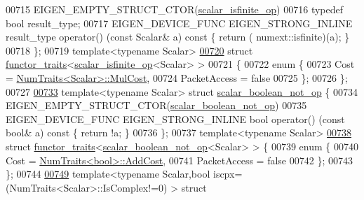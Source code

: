 \begin{DoxyCode}
00715   EIGEN\_EMPTY\_STRUCT\_CTOR(\hyperlink{struct_eigen_1_1internal_1_1scalar__isfinite__op}{scalar\_isfinite\_op})
00716   \textcolor{keyword}{typedef} \textcolor{keywordtype}{bool} result\_type;
00717   EIGEN\_DEVICE\_FUNC EIGEN\_STRONG\_INLINE result\_type operator() (\textcolor{keyword}{const} Scalar& a)\textcolor{keyword}{ const }\{ \textcolor{keywordflow}{return} (
      numext::isfinite)(a); \}
00718 \};
00719 \textcolor{keyword}{template}<\textcolor{keyword}{typename} Scalar>
\hyperlink{struct_eigen_1_1internal_1_1functor__traits_3_01scalar__isfinite__op_3_01_scalar_01_4_01_4}{00720} \textcolor{keyword}{struct }\hyperlink{struct_eigen_1_1internal_1_1functor__traits}{functor\_traits}<\hyperlink{struct_eigen_1_1internal_1_1scalar__isfinite__op}{scalar\_isfinite\_op}<Scalar> >
00721 \{
00722   \textcolor{keyword}{enum} \{
00723     Cost = \hyperlink{group___core___module_struct_eigen_1_1_num_traits}{NumTraits<Scalar>::MulCost},
00724     PacketAccess = \textcolor{keyword}{false}
00725   \};
00726 \};
00727 
\hyperlink{struct_eigen_1_1internal_1_1scalar__boolean__not__op}{00733} \textcolor{keyword}{template}<\textcolor{keyword}{typename} Scalar> \textcolor{keyword}{struct }\hyperlink{struct_eigen_1_1internal_1_1scalar__boolean__not__op}{scalar\_boolean\_not\_op} \{
00734   EIGEN\_EMPTY\_STRUCT\_CTOR(\hyperlink{struct_eigen_1_1internal_1_1scalar__boolean__not__op}{scalar\_boolean\_not\_op})
00735   EIGEN\_DEVICE\_FUNC EIGEN\_STRONG\_INLINE \textcolor{keywordtype}{bool} operator() (\textcolor{keyword}{const} \textcolor{keywordtype}{bool}& a)\textcolor{keyword}{ const }\{ \textcolor{keywordflow}{return} !a; \}
00736 \};
00737 \textcolor{keyword}{template}<\textcolor{keyword}{typename} Scalar>
\hyperlink{struct_eigen_1_1internal_1_1functor__traits_3_01scalar__boolean__not__op_3_01_scalar_01_4_01_4}{00738} \textcolor{keyword}{struct }\hyperlink{struct_eigen_1_1internal_1_1functor__traits}{functor\_traits}<\hyperlink{struct_eigen_1_1internal_1_1scalar__boolean__not__op}{scalar\_boolean\_not\_op}<Scalar> > \{
00739   \textcolor{keyword}{enum} \{
00740     Cost = \hyperlink{group___core___module_struct_eigen_1_1_num_traits}{NumTraits<bool>::AddCost},
00741     PacketAccess = \textcolor{keyword}{false}
00742   \};
00743 \};
00744 
\hyperlink{struct_eigen_1_1internal_1_1scalar__sign__op}{00749} template<typename Scalar,bool iscpx=(NumTraits<Scalar>::IsComplex!=0) > \textcolor{keyword}{struct} 

\end{DoxyCode}
